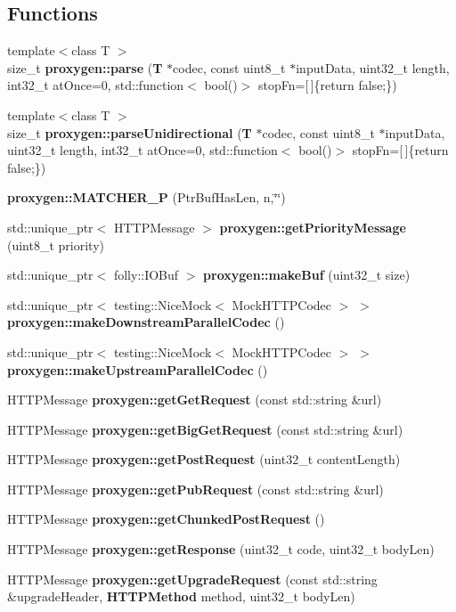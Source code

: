 \subsection*{Functions}
\begin{DoxyCompactItemize}
\item 
{\footnotesize template$<$class T $>$ }\\size\+\_\+t {\bf proxygen\+::parse} ({\bf T} $\ast$codec, const uint8\+\_\+t $\ast$input\+Data, uint32\+\_\+t length, int32\+\_\+t at\+Once=0, std\+::function$<$ bool()$>$ stop\+Fn=[$\,$]\{return false;\})
\item 
{\footnotesize template$<$class T $>$ }\\size\+\_\+t {\bf proxygen\+::parse\+Unidirectional} ({\bf T} $\ast$codec, const uint8\+\_\+t $\ast$input\+Data, uint32\+\_\+t length, int32\+\_\+t at\+Once=0, std\+::function$<$ bool()$>$ stop\+Fn=[$\,$]\{return false;\})
\item 
{\bf proxygen\+::\+M\+A\+T\+C\+H\+E\+R\+\_\+P} (Ptr\+Buf\+Has\+Len, n,\char`\"{}\char`\"{})
\item 
std\+::unique\+\_\+ptr$<$ H\+T\+T\+P\+Message $>$ {\bf proxygen\+::get\+Priority\+Message} (uint8\+\_\+t priority)
\item 
std\+::unique\+\_\+ptr$<$ folly\+::\+I\+O\+Buf $>$ {\bf proxygen\+::make\+Buf} (uint32\+\_\+t size)
\item 
std\+::unique\+\_\+ptr$<$ testing\+::\+Nice\+Mock$<$ Mock\+H\+T\+T\+P\+Codec $>$ $>$ {\bf proxygen\+::make\+Downstream\+Parallel\+Codec} ()
\item 
std\+::unique\+\_\+ptr$<$ testing\+::\+Nice\+Mock$<$ Mock\+H\+T\+T\+P\+Codec $>$ $>$ {\bf proxygen\+::make\+Upstream\+Parallel\+Codec} ()
\item 
H\+T\+T\+P\+Message {\bf proxygen\+::get\+Get\+Request} (const std\+::string \&url)
\item 
H\+T\+T\+P\+Message {\bf proxygen\+::get\+Big\+Get\+Request} (const std\+::string \&url)
\item 
H\+T\+T\+P\+Message {\bf proxygen\+::get\+Post\+Request} (uint32\+\_\+t content\+Length)
\item 
H\+T\+T\+P\+Message {\bf proxygen\+::get\+Pub\+Request} (const std\+::string \&url)
\item 
H\+T\+T\+P\+Message {\bf proxygen\+::get\+Chunked\+Post\+Request} ()
\item 
H\+T\+T\+P\+Message {\bf proxygen\+::get\+Response} (uint32\+\_\+t code, uint32\+\_\+t body\+Len)
\item 
H\+T\+T\+P\+Message {\bf proxygen\+::get\+Upgrade\+Request} (const std\+::string \&upgrade\+Header, {\bf H\+T\+T\+P\+Method} method, uint32\+\_\+t body\+Len)

\end{DoxyCompactItemize}
